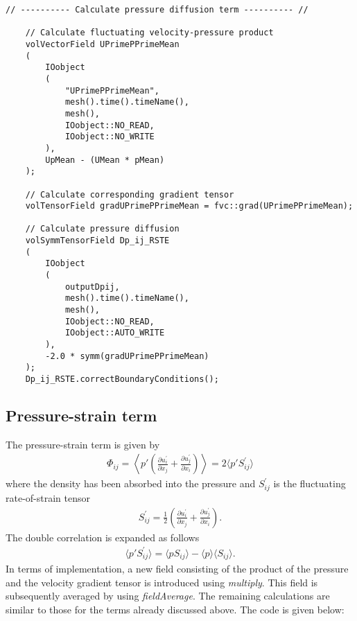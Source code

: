 \begin{lstlisting}[emph={ddt,div,laplacian}]
    // ---------- Calculate pressure diffusion term ---------- //

    // Calculate fluctuating velocity-pressure product
    volVectorField UPrimePPrimeMean
    (
        IOobject
        (
            "UPrimePPrimeMean",
            mesh().time().timeName(),
            mesh(),
            IOobject::NO_READ,
            IOobject::NO_WRITE
        ),
        UpMean - (UMean * pMean)
    );

    // Calculate corresponding gradient tensor
    volTensorField gradUPrimePPrimeMean = fvc::grad(UPrimePPrimeMean); 

    // Calculate pressure diffusion
    volSymmTensorField Dp_ij_RSTE
    (
        IOobject
        (
            outputDpij,
            mesh().time().timeName(),
            mesh(),
            IOobject::NO_READ,
            IOobject::AUTO_WRITE
        ),
        -2.0 * symm(gradUPrimePPrimeMean)
    );
    Dp_ij_RSTE.correctBoundaryConditions();
\end{lstlisting}

\subsection{Pressure-strain term}
\label{subsec:pressure_strain}

The pressure-strain term is given by
\begin{align}
    \Phi_{ij} 
    = 
    \left\langle p' \left( \frac{\partial u^{\prime}_i}{\partial x_j} + \frac{\partial u^{\prime}_j}{\partial x_i} \right) \right\rangle
    =
    2 \langle p' S^{\prime}_{ij} \rangle
\end{align}
where the density has been absorbed into the pressure and $S^{\prime}_{ij}$ is the fluctuating rate-of-strain tensor
\begin{align}
    S^{\prime}_{ij} = \frac{1}{2} \left( \frac{\partial u^{\prime}_i}{\partial x_j} + \frac{\partial u^{\prime}_j}{\partial x_i} \right) .
\end{align}
The double correlation is expanded as follows
\begin{align}
    \langle p' S^{\prime}_{ij} \rangle 
    = 
    \langle p S_{ij} \rangle - \langle p \rangle \langle S_{ij} \rangle .
\end{align}
In terms of implementation, a new field consisting of the product of the pressure and the velocity gradient tensor is introduced using \emph{multiply}. This field is subsequently averaged by using \emph{fieldAverage}.
The remaining calculations are similar to those for the terms already discussed above.
The \OF code is given below:

